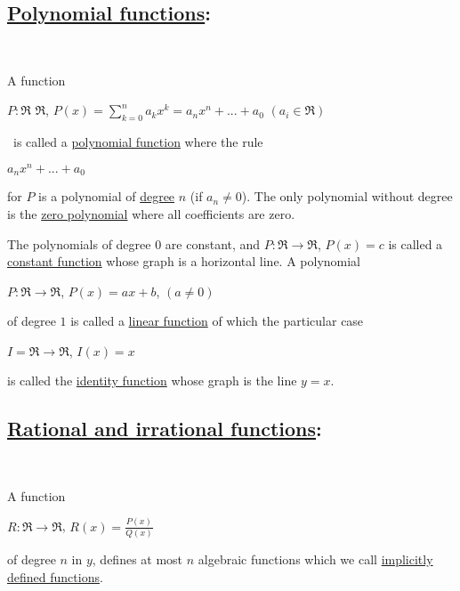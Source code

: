 \documentclass[11pt]{amsbook}
\begin{document}
\subsection*{%
\underline{Polynomial functions}:} \

A function \\

\begin{center}
$P: \Re $ \; $\Re$, \; $P(x) = \sum_{k = 0}^{n} a_k x^k = a_n x^n + . . . + a_0$ \; $( a_i \in \Re )$
\end{center} \
is called a \underline{polynomial function} where the rule \\

\begin{center}
$a_n x^n + . . . + a_0$ 
\end{center} 
for $P$ is a polynomial of \underline{degree} $n$ (if $a_n \neq 0$). The only polynomial without degree is the \underline{zero polynomial} where all coefficients are zero.

The polynomials of degree $0$ are constant, and $P: \Re \rightarrow \Re $, $P(x) = c$ is called a \underline{constant function} whose graph is a horizontal line. A polynomial \\

\begin{center}
$P: \Re \rightarrow \Re$, \;  $P(x) = ax + b$, \; $( a \neq 0 )$
\end{center}
of degree $1$ is called a \underline{linear function} of which the particular case \\

\begin{center}
$I = \Re \rightarrow \Re$, \; $I(x) = x$
\end{center}
is called the \underline{identity function} whose graph is the line $y = x$. \\





\subsection*{%
\underline{Rational and irrational functions}:} \

A function 

\begin{center}
$R: \Re \rightarrow \Re$, \; $R(x) = \frac{P(x)}{Q(x)}$
\end{center}
\noindent %
of degree $n$ in $y$, defines at most $n$ algebraic functions
which we call \underline{implicitly} \\
\underline{defined functions}. %
\end{document}
